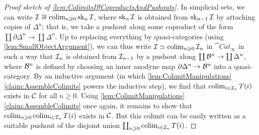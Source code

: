 \begin{proof}[Proof sketch of \cref{lem:ColimitsIffCoproductsAndPushouts}]
	In simplicial sets, we can write $\mathcal{I}\cong \operatorname*{colim}_{n\geqslant 0}\operatorname{sk}_n\mathcal{I}$, where $\operatorname{sk}_{n}\mathcal{I}$ is obtained from $\operatorname{sk}_{n-1}\mathcal{I}$ by attaching copies of $\Delta^n$; that is, we take a pushout along some coproduct of the form $\coprod \partial\Delta^n\rightarrow \coprod\Delta^n$. Up to replacing everything by quasi-categories (using \cref{lem:SmallObjectArgument}), we can thus write $\mathcal{I}\simeq \operatorname*{colim}_{n\geqslant 0}\mathcal{I}_n$ in $\cat{Cat}_\infty$ in such a way that $\mathcal{I}_n$ is obtained from $\mathcal{I}_{n-1}$ by a pushout along $\coprod \mathcal{B}^n\rightarrow \coprod \Delta^n$, where $\mathcal{B}^n$ is defined by choosing an inner anodyne map $\partial\Delta^n\rightarrow \mathcal{B}^n$ into a quasi-category. By an inductive argument (in which \cref{lem:ColimitManipulations}\cref{claim:AssembleColimits} powers the inductive step), we find that $\operatorname*{colim}_{i\in\mathcal{I}_n}T(i)$ exists in $\mathcal{C}$ for all $n\geqslant 0$. Using \cref{lem:ColimitManipulations}\cref{claim:AssembleColimits} once again, it remains to show that $\operatorname*{colim}_{n\geqslant 0}\operatorname*{colim}_{i\in\mathcal{I}_n}T(i)$ exists in $\mathcal{C}$. But this colimit can be easily written as a suitable pushout of the disjoint union $\coprod_{n\geqslant 0}\operatorname*{colim}_{i\in\mathcal{I}_n}T(i)$.
\end{proof}

